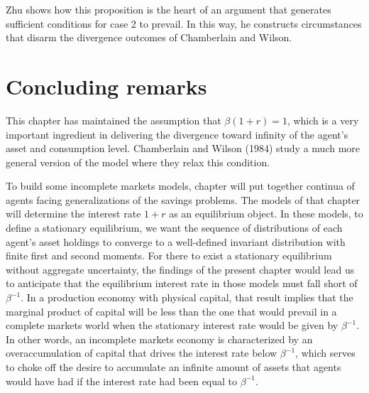 \noindent Zhu shows how this proposition is the heart of an argument that generates sufficient conditions for case 2 to prevail. In this way,
he constructs circumstances that disarm the divergence outcomes of Chamberlain and Wilson.
%
%
%


\section{Concluding remarks}

  This chapter has maintained the assumption that $\beta (1+r) =1$,
which is a very important ingredient in delivering the divergence
toward infinity of the agent's asset and consumption level.
  Chamberlain and Wilson (1984)
study a much more general version of the model where they relax this condition.
 

To build
some incomplete markets models, chapter  will put together continua of agents
facing generalizations of the savings problems.  The models of that chapter will
determine the interest rate $1+r$ as an equilibrium object. In
these models, to define a stationary equilibrium, we want the
sequence of distributions of each agent's asset holdings to
converge to a well-defined invariant distribution with finite
first and second moments.  For there to exist a stationary
equilibrium without aggregate uncertainty, the findings of the
present chapter would lead us to anticipate that the equilibrium
interest rate in those models must fall short of $\beta^{-1}$. In
a production economy with physical capital, that result implies
that the marginal product of capital will be less than the one
that would prevail in a complete markets world when the stationary
interest rate would be given by $\beta^{-1}$. In other words, an
incomplete markets economy is characterized by an overaccumulation
of capital that drives the interest rate below $\beta^{-1}$, which
serves to choke off  the desire to accumulate an infinite amount of
assets that agents would have had  if the interest rate had been equal
to $\beta^{-1}$.

